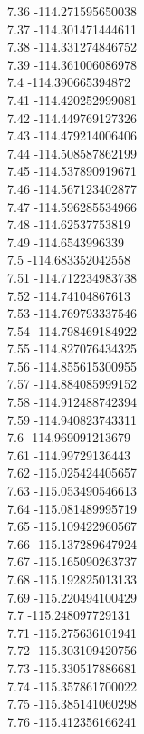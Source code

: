{7.36	-114.271595650038\\
7.37	-114.301471444611\\
7.38	-114.331274846752\\
7.39	-114.361006086978\\
7.4	-114.390665394872\\
7.41	-114.420252999081\\
7.42	-114.449769127326\\
7.43	-114.479214006406\\
7.44	-114.508587862199\\
7.45	-114.537890919671\\
7.46	-114.567123402877\\
7.47	-114.596285534966\\
7.48	-114.62537753819\\
7.49	-114.6543996339\\
7.5	-114.683352042558\\
7.51	-114.712234983738\\
7.52	-114.74104867613\\
7.53	-114.769793337546\\
7.54	-114.798469184922\\
7.55	-114.827076434325\\
7.56	-114.855615300955\\
7.57	-114.884085999152\\
7.58	-114.912488742394\\
7.59	-114.940823743311\\
7.6	-114.969091213679\\
7.61	-114.99729136443\\
7.62	-115.025424405657\\
7.63	-115.053490546613\\
7.64	-115.081489995719\\
7.65	-115.109422960567\\
7.66	-115.137289647924\\
7.67	-115.165090263737\\
7.68	-115.192825013133\\
7.69	-115.220494100429\\
7.7	-115.248097729131\\
7.71	-115.275636101941\\
7.72	-115.303109420756\\
7.73	-115.330517886681\\
7.74	-115.357861700022\\
7.75	-115.385141060298\\
7.76	-115.412356166241\\
}
